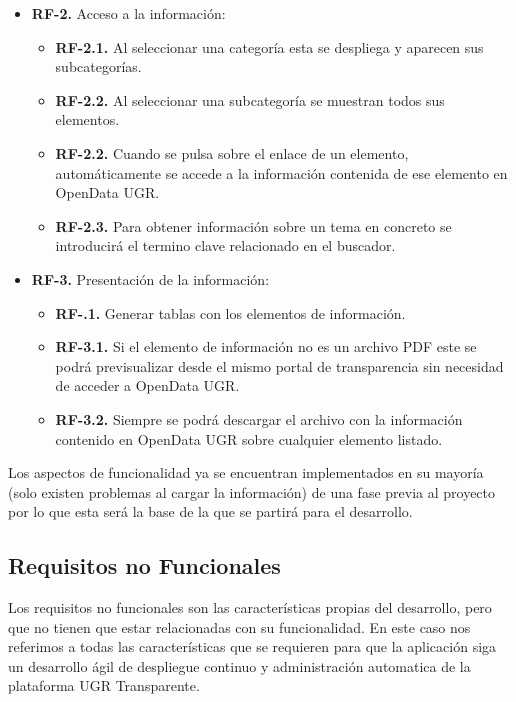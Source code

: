 \begin{itemize}
  \item \textbf{RF-2.} Acceso a la información:
  \begin{itemize}
    \item \textbf{RF-2.1.} Al seleccionar una categoría esta se despliega y aparecen sus subcategorías.
    \item \textbf{RF-2.2.} Al seleccionar una subcategoría se muestran todos sus elementos.
    \item \textbf{RF-2.2.} Cuando se pulsa sobre el enlace de un elemento, automáticamente se accede a la información contenida 
    de ese elemento en OpenData UGR.
    \item \textbf{RF-2.3.} Para obtener información sobre un tema en concreto se introducirá el termino clave relacionado en 
    el buscador.
    \end{itemize}
\end{itemize}

\begin{itemize}
  \item \textbf{RF-3.} Presentación de la información:
  \begin{itemize}
    \item \textbf{RF-.1.} Generar tablas con los elementos de información.
    \item \textbf{RF-3.1.} Si el elemento de información no es un archivo PDF este se podrá previsualizar desde el mismo portal
    de transparencia sin necesidad de acceder a OpenData UGR.
    \item \textbf{RF-3.2.} Siempre se podrá descargar el archivo con la información contenido en OpenData UGR sobre cualquier 
    elemento listado.
  \end{itemize}
\end{itemize}
	
Los aspectos de funcionalidad ya se encuentran implementados en su mayoría (solo existen problemas al cargar la información) de
una fase previa al proyecto por lo que esta será la base de la que se partirá para el desarrollo.

\subsection{Requisitos no Funcionales}

Los requisitos no funcionales son las características propias del desarrollo, pero que no tienen que estar relacionadas con su 
funcionalidad. En este caso nos referimos a todas las características que se requieren para que la aplicación siga un 
desarrollo ágil de despliegue continuo y administración automatica de la plataforma UGR Transparente.

